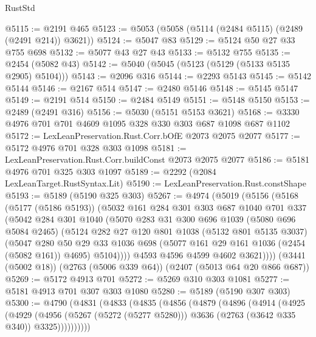 \begin{lexlean}{RustStd}
\begin{coremodule}
@5115 := @2191 @465
@5123 := @5053 (@5058 (@5114 (@2484 @5115) (@2489 (@2491 @214)) @3621))
@5124 := @5047 @83
@5129 := @5124 @50 @27 @33 @755 @698
@5132 := @5077 @43 @27 @43
@5133 := @5132 @755
@5135 := @2454 (@5082 @43)
@5142 := @5040 (@5045 (@5123 (@5129 (@5133 @5135 @2905) @5104)))
@5143 := @2096 @316
@5144 := @2293 @5143
@5145 := @5142 @5144
@5146 := @2167 @514
@5147 := @2480 @5146
@5148 := @5145 @5147
@5149 := @2191 @514
@5150 := @2484 @5149
@5151 := @5148 @5150
@5153 := @2489 (@2491 @316)
@5156 := @5030 (@5151 @5153 @3621)
@5168 := @3330 @4976 @701 @701 @4609 @1095 @328 @330 @303 @687 @1098 @687 @1102
@5172 := LexLeanPreservation.Rust.Corr.bOfE @2073 @2075 @2077
@5177 := @5172 @4976 @701 @328 @303 @1098
@5181 := LexLeanPreservation.Rust.Corr.buildConst @2073 @2075 @2077
@5186 := @5181 @4976 @701 @325 @303 @1097
@5189 := @2292 (@2084 LexLeanTarget.RustSyntax.Lit)
@5190 := LexLeanPreservation.Rust.constShape
@5193 := @5189 (@5190 @325 @303)
@5267 := @4974
    (@5019
      (@5156
        (@5168
          (@5177 (@5186 @5193))
          (@5032
            @161
            @284
            @301
            @303
            @687
            @1040
            @701
            @337
            (@5042
              @284
              @301
              @1040
              (@5070
                @283
                @31
                @300
                @696
                @1039
                (@5080 @696 @5084 @2465)
                (@5124
                  @282
                  @27
                  @120
                  @801
                  @1038
                  (@5132 @801 @5135 @3037)
                  (@5047
                    @280
                    @50
                    @29
                    @33
                    @1036
                    @698
                    (@5077 @161 @29 @161 @1036 (@2454 (@5082 @161)) @4695)
                    @5104))))
            @4593
            @4596
            @4599
            @4602
            @3621))))
    (@3441 (@5002 @18))
    (@2763 (@5006 @339 @64))
    (@2407 (@5013 @64 @20 @866 @687))
@5269 := @5172 @4913 @701
@5272 := @5269 @310 @303 @1081
@5277 := @5181 @4913 @701 @307 @303 @1080
@5280 := @5189 (@5190 @307 @303)
@5300 := @4790
    (@4831
      (@4833
        (@4835
          (@4856
            (@4879
              (@4896
                (@4914
                  (@4925
                    (@4929
                      (@4956
                        (@5267 (@5272 (@5277 @5280)))
                        @3636
                        (@2763 (@3642 @335 @340))
                        @3325))))))))))

\end{coremodule}
\end{lexlean}
